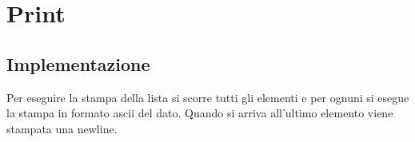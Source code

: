 \section{Print}
\subsection{Implementazione}
Per eseguire la stampa della lista si scorre tutti gli elementi e per ognuni si 
esegue la stampa in formato ascii del dato.
Quando si arriva all'ultimo elemento viene stampata una newline.